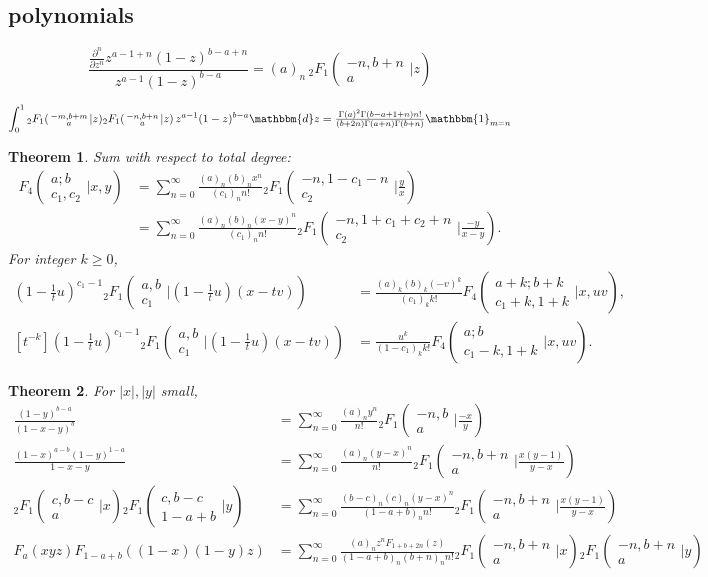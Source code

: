 \documentclass[12pt]{article}
\newcommand{\dd}[0] {\mathbbm{d}}
\newcommand{\one}[0] {\mathbbm{1}}
\numberwithin{equation}{section}
\newtheorem{theorem}{Theorem}[section]
\newcommand{\Head}[3] {{}_{#1}{#2}_{#3}}
\newcommand{\ArgS}[3] {( \begin{smallmatrix} #1 \\ #2 \end{smallmatrix} | {#3})}
\newcommand{\HypJ}[2] {F_{#1}(#2)}
\newcommand{\appellFfourS}[6]    {F_4 \ArgS{{#1};{#2}}{{#3},{#4}}{{#5},{#6}}}
\begin{document}
\subsection{polynomials}

\begin{equation*}
\frac{\frac{\partial^n}{\partial z^n} z^{a-1+n}(1-z)^{b-a+n}}{z^{a-1}(1-z)^{b-a}} = (a)_n \, \Head{2}{F}{1} \ArgS{-n,b+n}{a}{z}
\end{equation*}

\begin{equation*}
\int_0^1 \Head{2}{F}{1} \ArgS{-m,b+m}{a}{z} \Head{2}{F}{1} \ArgS{-n,b+n}{a}{z} \, z^{a-1}(1-z)^{b-a} \dd z = \tfrac{\Gamma (a)^2 \Gamma(b-a+1+n) n!}{(b+2 n) \Gamma (a+n) \Gamma(b+n)} \one_{m=n}
\end{equation*}

\begin{theorem}
\label{thm_appelF4_sum}
Sum with respect to total degree:
\begin{align*}
\appellFfourS{a}{b}{c_1}{c_2}{x}{y} &= \sum_{n=0}^{\infty} \tfrac{(a)_n (b)_n x^n}{(c_1)_n n!} \Head2F1 \ArgS{-n,1-c_1-n}{c_2}{\tfrac{y}{x}}\\
 &= \sum_{n=0}^{\infty} \tfrac{(a)_n (b)_n (x-y)^n}{(c_1)_n n!} \Head2F1 \ArgS{-n,1+c_1+c_2+n}{c_2}{\tfrac{-y}{x-y}}\text{.}
\end{align*}
For integer $k \ge 0$,
\begin{align*}
[t^{k}] (1- \tfrac1t u)^{c_1-1} \Head2F1 \ArgS{a,b}{c_1}{(1-\tfrac1t u)(x-t v)} &= \tfrac{(a)_k (b)_k (-v)^k}{(c_1)_k k!} \appellFfourS{a+k}{b+k}{c_1+k}{1+k}{x}{u v}\text{,}\\
[t^{-k}] (1-\tfrac1t u)^{c_1-1} \Head2F1 \ArgS{a,b}{c_1}{(1-\tfrac1t u)(x-t v)} &= \tfrac{u^k}{(1-c_1)_k k!} \appellFfourS{a}{b}{c_1-k}{1+k}{x}{u v}\text{.}
\end{align*}
\end{theorem}


\begin{theorem}
For $|x|,|y|$ small,
\begin{align*}
\tfrac{(1-y)^{b-a}}{(1-x-y)^b} &= \sum_{n=0}^{\infty} \tfrac{(a)_n y^n}{n!} \Head{2}{F}{1} \ArgS{-n,b}{a}{\tfrac{-x}{y}}\\
\tfrac{(1-x)^{a-b}(1-y)^{1-a}}{1-x-y} &= \sum_{n=0}^{\infty} \tfrac{(a)_n (y-x)^n}{n!} \Head{2}{F}{1} \ArgS{-n,b+n}{a}{\tfrac{x(y-1)}{y-x}}\\
\Head{2}{F}{1} \ArgS{c,b-c}{a}{x} \Head{2}{F}{1} \ArgS{c,b-c}{1-a+b}{y} &= \sum_{n=0}^{\infty} \tfrac{(b-c)_n (c)_n (y-x)^n}{(1-a+b)_n n!} \Head{2}{F}{1} \ArgS{-n,b+n}{a}{\tfrac{x(y-1)}{y-x}}\\
\HypJ{a}{x y z}\HypJ{1-a+b}{(1-x)(1-y)z} &= \sum_{n=0}^{\infty} \tfrac{(a)_n z^n \HypJ{1+b+2n}{z} }{(1-a+b)_n (b+n)_n n!}\Head{2}{F}{1} \ArgS{-n,b+n}{a}{x} \Head2F1\ArgS{-n,b+n}{a}{y}
\end{align*}
\end{theorem}
\end{document}
